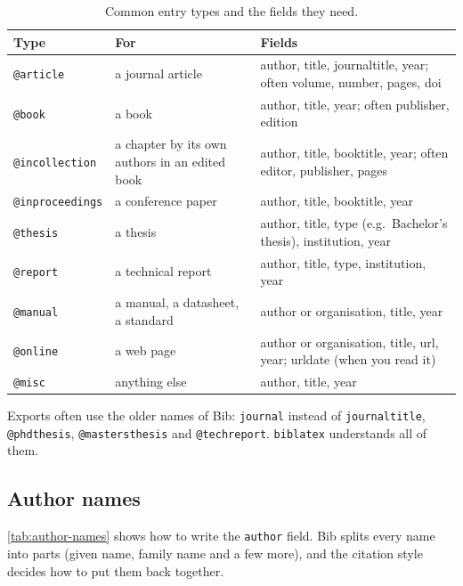 \begin{table}[htbp]
    \centering
    \caption{Common entry types and the fields they need.}
    \label{tab:entry-types}
    \begin{tabularx}{\linewidth}{@{}l>{\raggedright\arraybackslash}X>{\raggedright\arraybackslash}X@{}}
        \toprule
        \textbf{Type} & \textbf{For} & \textbf{Fields} \\
        \midrule
        \texttt{@article}       & a journal article     & author, title, journaltitle, year; often volume, number, pages, doi \\
        \texttt{@book}          & a book                & author, title, year; often publisher, edition \\
        \texttt{@incollection}  & a chapter by its own authors in an edited book & author, title, booktitle, year; often editor, publisher, pages \\
        \texttt{@inproceedings} & a conference paper    & author, title, booktitle, year \\
        \texttt{@thesis}        & a thesis              & author, title, type (e.g.\ {Bachelor's thesis}), institution, year \\
        \texttt{@report}        & a technical report    & author, title, type, institution, year \\
        \texttt{@manual}        & a manual, a datasheet, a standard & author or organisation, title, year \\
        \texttt{@online}        & a web page            & author or organisation, title, url, year; urldate (when you read it) \\
        \texttt{@misc}          & anything else         & author, title, year \\
        \bottomrule
    \end{tabularx}
\end{table}

Exports often use the older names of Bib:
\texttt{journal} instead of \texttt{journaltitle},
\texttt{@phdthesis}, \texttt{@mastersthesis} and \texttt{@techreport}.
\texttt{biblatex} understands all of them.

\subsection{Author names}

\autoref{tab:author-names} shows how to write the \texttt{author} field.
Bib splits every name into parts (given name, family name and a few more),
and the citation style decides how to put them back together.

